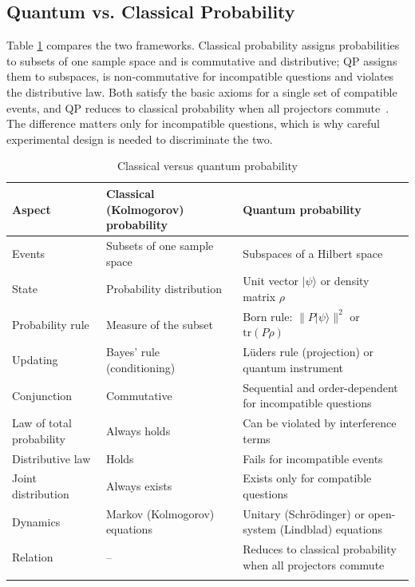 \documentclass[pdflatex,sn-basic]{sn-jnl}
\newcommand{\ket}[1]{|#1\rangle}
\begin{document}
\subsection{Quantum vs. Classical Probability}\label{sec:qvc}
Table \ref{tab:qvc} compares the two frameworks. Classical probability assigns probabilities to subsets of one sample space and is commutative and distributive; QP assigns them to subspaces, is non-commutative for incompatible questions and violates the distributive law. Both satisfy the basic axioms for a single set of compatible events, and QP reduces to classical probability when all projectors commute~\citep{Bruza2015}. The difference matters only for incompatible questions, which is why careful experimental design is needed to discriminate the two.

\begin{table}[ht]
\caption{Classical versus quantum probability}\label{tab:qvc}%
\footnotesize
\begin{tabular}{@{}>{\raggedright\arraybackslash}p{0.240\dimexpr\textwidth-6\tabcolsep\relax}>{\raggedright\arraybackslash}p{0.360\dimexpr\textwidth-6\tabcolsep\relax}>{\raggedright\arraybackslash}p{0.400\dimexpr\textwidth-6\tabcolsep\relax}@{}}
\toprule
\textbf{Aspect} & \textbf{Classical (Kolmogorov) probability} & \textbf{Quantum probability} \\ \midrule
Events & Subsets of one sample space & Subspaces of a Hilbert space \\
State & Probability distribution & Unit vector $\ket{\psi}$ or density matrix $\rho$ \\
Probability rule & Measure of the subset & Born rule: $\lVert P\ket{\psi}\rVert^2$ or $\mathrm{tr}(P\rho)$ \\
Updating & Bayes' rule (conditioning) & L\"uders rule (projection) or quantum instrument \\
Conjunction & Commutative & Sequential and order-dependent for incompatible questions \\
Law of total probability & Always holds & Can be violated by interference terms \\
Distributive law & Holds & Fails for incompatible events \\
Joint distribution & Always exists & Exists only for compatible questions \\
Dynamics & Markov (Kolmogorov) equations & Unitary (Schr\"odinger) or open-system (Lindblad) equations \\
Relation & -- & Reduces to classical probability when all projectors commute \\
\botrule
\end{tabular}
\end{table}
\end{document}
